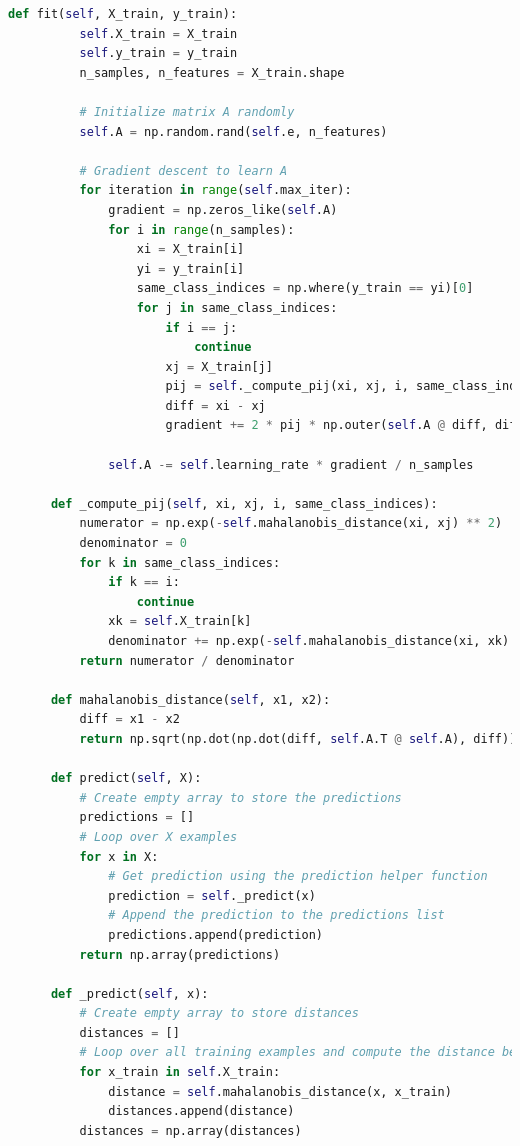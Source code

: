 \documentclass[12pt]{article}
\begin{document}
\begin{lstlisting}[language=Python]
      def fit(self, X_train, y_train):
          self.X_train = X_train
          self.y_train = y_train
          n_samples, n_features = X_train.shape
          
          # Initialize matrix A randomly
          self.A = np.random.rand(self.e, n_features)
          
          # Gradient descent to learn A
          for iteration in range(self.max_iter):
              gradient = np.zeros_like(self.A)
              for i in range(n_samples):
                  xi = X_train[i]
                  yi = y_train[i]
                  same_class_indices = np.where(y_train == yi)[0]
                  for j in same_class_indices:
                      if i == j:
                          continue
                      xj = X_train[j]
                      pij = self._compute_pij(xi, xj, i, same_class_indices)
                      diff = xi - xj
                      gradient += 2 * pij * np.outer(self.A @ diff, diff)
              
              self.A -= self.learning_rate * gradient / n_samples
      
      def _compute_pij(self, xi, xj, i, same_class_indices):
          numerator = np.exp(-self.mahalanobis_distance(xi, xj) ** 2)
          denominator = 0
          for k in same_class_indices:
              if k == i:
                  continue
              xk = self.X_train[k]
              denominator += np.exp(-self.mahalanobis_distance(xi, xk) ** 2)
          return numerator / denominator
  
      def mahalanobis_distance(self, x1, x2):
          diff = x1 - x2
          return np.sqrt(np.dot(np.dot(diff, self.A.T @ self.A), diff))
  
      def predict(self, X):
          # Create empty array to store the predictions
          predictions = []
          # Loop over X examples
          for x in X:
              # Get prediction using the prediction helper function
              prediction = self._predict(x)
              # Append the prediction to the predictions list
              predictions.append(prediction)
          return np.array(predictions)
      
      def _predict(self, x):
          # Create empty array to store distances
          distances = []
          # Loop over all training examples and compute the distance between x and all the training examples 
          for x_train in self.X_train:
              distance = self.mahalanobis_distance(x, x_train)
              distances.append(distance)
          distances = np.array(distances)
          

\end{lstlisting}
\end{document}
